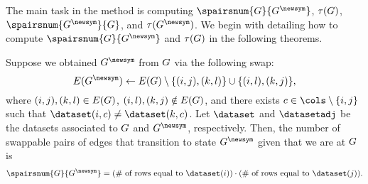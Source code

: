 The main task in the \methasrev{} method is computing
$\spairsnum{\graph}{\graphadj}$, $\tau(G)$,
$\spairsnum{\graphadj}{\graph}$, and $\graphadjnum{\graphadj}$. We begin with
detailing how to compute $\spairsnum{\graph}{\graphadj}$ and
$\tau(G)$ in the following theorems.

\begin{theorem}
  Suppose we obtained $\graphadj$ from $G$ via the following swap:
  \[
    \edges(\graphadj) \leftarrow \edges(\graph) \setminus \{(i, j), (k, l)\}
    \cup \{(i, l), (k, j)\},
  \]
  where $(i, j), (k, l) \in E(G)$, $(i, l), (k, j) \notin
  E(G)$, and there exists $c \in \cols \setminus \{i, j\}$ such that
  $\dataset(i, c) \neq \dataset(k, c)$. Let $\dataset$ and $\datasetadj$ be the
  datasets associated to $G$ and $\graphadj$, respectively. Then, the
  number of swappable pairs of edges that transition to state $\graphadj$ given
  that we are at $G$ is
  \[
    \spairsnum{\graph}{\graphadj} = (\text{\# of rows equal to $\dataset(i)$})
    \cdot (\text{\# of rows equal to $\dataset(j)$}).
  \]
\end{theorem}

